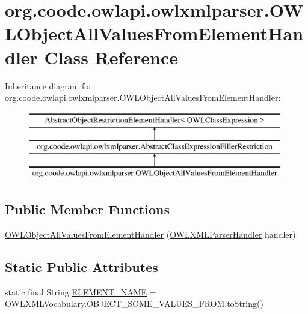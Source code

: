 \hypertarget{classorg_1_1coode_1_1owlapi_1_1owlxmlparser_1_1_o_w_l_object_all_values_from_element_handler}{\section{org.\-coode.\-owlapi.\-owlxmlparser.\-O\-W\-L\-Object\-All\-Values\-From\-Element\-Handler Class Reference}
\label{classorg_1_1coode_1_1owlapi_1_1owlxmlparser_1_1_o_w_l_object_all_values_from_element_handler}
}
Inheritance diagram for org.\-coode.\-owlapi.\-owlxmlparser.\-O\-W\-L\-Object\-All\-Values\-From\-Element\-Handler\-:\begin{figure}[H]
\begin{center}
\leavevmode
\includegraphics[height=3.000000cm]{classorg_1_1coode_1_1owlapi_1_1owlxmlparser_1_1_o_w_l_object_all_values_from_element_handler}
\end{center}
\end{figure}
\subsection*{Public Member Functions}
\begin{DoxyCompactItemize}
\item 
\hyperlink{classorg_1_1coode_1_1owlapi_1_1owlxmlparser_1_1_o_w_l_object_all_values_from_element_handler_a490f65a9264c6e65a55960b76df64966}{O\-W\-L\-Object\-All\-Values\-From\-Element\-Handler} (\hyperlink{classorg_1_1coode_1_1owlapi_1_1owlxmlparser_1_1_o_w_l_x_m_l_parser_handler}{O\-W\-L\-X\-M\-L\-Parser\-Handler} handler)
\end{DoxyCompactItemize}
\subsection*{Static Public Attributes}
\begin{DoxyCompactItemize}
\item 
static final String \hyperlink{classorg_1_1coode_1_1owlapi_1_1owlxmlparser_1_1_o_w_l_object_all_values_from_element_handler_a08df3b74de2384bc2600bc684c45581b}{E\-L\-E\-M\-E\-N\-T\-\_\-\-N\-A\-M\-E} = O\-W\-L\-X\-M\-L\-Vocabulary.\-O\-B\-J\-E\-C\-T\-\_\-\-S\-O\-M\-E\-\_\-\-V\-A\-L\-U\-E\-S\-\_\-\-F\-R\-O\-M.\-to\-String()
\end{DoxyCompactItemize}
